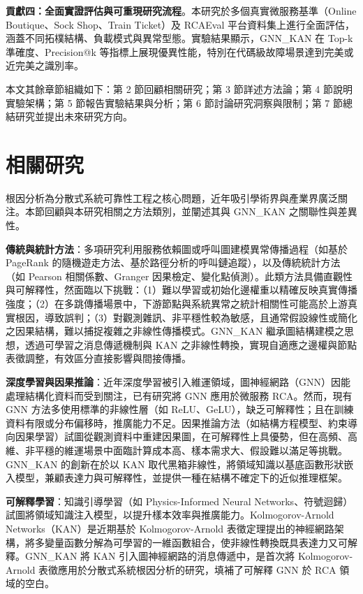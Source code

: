 \documentclass[10pt,a4paper,twocolumn]{article}
\begin{document}
\textbf{貢獻四：全面實證評估與可重現研究流程}。本研究於多個真實微服務基準（Online Boutique、Sock Shop、Train Ticket）及 RCAEval 平台資料集上進行全面評估，涵蓋不同拓樸結構、負載模式與異常型態。實驗結果顯示，GNN\_KAN 在 Top-k 準確度、Precision@k 等指標上展現優異性能，特別在代碼級故障場景達到完美或近完美之識別率。

本文其餘章節組織如下：第 2 節回顧相關研究；第 3 節詳述方法論；第 4 節說明實驗架構；第 5 節報告實驗結果與分析；第 6 節討論研究洞察與限制；第 7 節總結研究並提出未來研究方向。

\section{相關研究}

根因分析為分散式系統可靠性工程之核心問題，近年吸引學術界與產業界廣泛關注。本節回顧與本研究相關之方法類別，並闡述其與 GNN\_KAN 之關聯性與差異性。

\textbf{傳統與統計方法}：多項研究利用服務依賴圖或呼叫圖建模異常傳播過程（如基於 PageRank 的隨機遊走方法、基於路徑分析的呼叫鏈追蹤），以及傳統統計方法（如 Pearson 相關係數、Granger 因果檢定、變化點偵測）。此類方法具備直觀性與可解釋性，然面臨以下挑戰：（1）難以學習或初始化邊權重以精確反映真實傳播強度；（2）在多跳傳播場景中，下游節點與系統異常之統計相關性可能高於上游真實根因，導致誤判；（3）對觀測雜訊、非平穩性較為敏感，且通常假設線性或簡化之因果結構，難以捕捉複雜之非線性傳播模式。GNN\_KAN 繼承圖結構建模之思想，透過可學習之消息傳遞機制與 KAN 之非線性轉換，實現自適應之邊權與節點表徵調整，有效區分直接影響與間接傳播。

\textbf{深度學習與因果推論}：近年深度學習被引入維運領域，圖神經網路（GNN）因能處理結構化資料而受到關注，已有研究將 GNN 應用於微服務 RCA。然而，現有 GNN 方法多使用標準的非線性層（如 ReLU、GeLU），缺乏可解釋性；且在訓練資料有限或分布偏移時，推廣能力不足。因果推論方法（如結構方程模型、約束導向因果學習）試圖從觀測資料中重建因果圖，在可解釋性上具優勢，但在高頻、高維、非平穩的維運場景中面臨計算成本高、樣本需求大、假設難以滿足等挑戰。GNN\_KAN 的創新在於以 KAN 取代黑箱非線性，將領域知識以基底函數形狀嵌入模型，兼顧表達力與可解釋性，並提供一種在結構不確定下的近似推理框架。

\textbf{可解釋學習}：知識引導學習（如 Physics-Informed Neural Networks、符號迴歸）試圖將領域知識注入模型，以提升樣本效率與推廣能力。Kolmogorov-Arnold Networks（KAN）是近期基於 Kolmogorov-Arnold 表徵定理提出的神經網路架構，將多變量函數分解為可學習的一維函數組合，使非線性轉換既具表達力又可解釋。GNN\_KAN 將 KAN 引入圖神經網路的消息傳遞中，是首次將 Kolmogorov-Arnold 表徵應用於分散式系統根因分析的研究，填補了可解釋 GNN 於 RCA 領域的空白。
\end{document}
